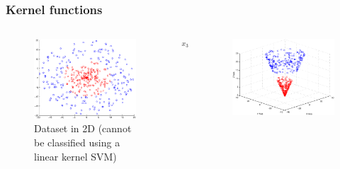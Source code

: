 \documentclass[9pt]{beamer}
\begin{document}
    \begin{frame}
        \frametitle{Kernel functions}
        \begin{columns}
            \begin{column}{0.4\textwidth}
                \begin{figure}
                    \centering
                    \includegraphics[width=\textwidth]{figures/svm_non_linear_data.eps}
                    \caption{Dataset in 2D (cannot be classified using a linear kernel SVM)}
                \end{figure}
            \end{column}
            \begin{column}{0.2\textwidth}
                \begin{center}
                    $\xrightarrow{x_3 = \sqrt{x_1^2 + x_2^2}}$
                \end{center}
            \end{column}
            \begin{column}{0.4\textwidth}
                \begin{figure}
                    \centering
                    \includegraphics[width=\textwidth]{figures/svm_non_linear_data_3d.eps}

\end{figure}
\end{column}
\end{columns}
\end{frame}
\end{document}
